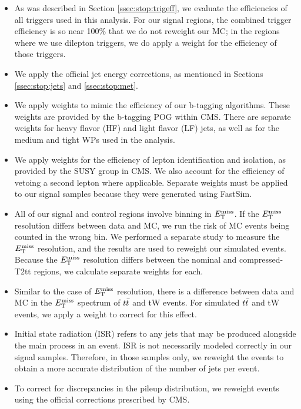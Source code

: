 \begin{itemize}
\item As was described in Section \ref{ssec:stop:trigeff}, we evaluate
  the efficiencies of all triggers used in this analysis. For our
  signal regions, the combined trigger efficiency is so near 100\% that we
  do not reweight our MC; in the regions where we use dilepton
  triggers, we do apply a weight for the efficiency of those triggers.
\item We apply the official jet energy corrections, as mentioned in
  Sections \ref{ssec:stop:jets} and \ref{ssec:stop:met}.
\item We apply weights to mimic the efficiency of our b-tagging
  algorithms. These weights are provided by the b-tagging POG within
  CMS. There are separate weights for heavy flavor (HF) and light
  flavor (LF) jets, as well as for the medium and tight WPs used in
  the analysis.
\item We apply weights for the efficiency of lepton identification and
  isolation, as provided by the SUSY group in CMS. We also account for
  the efficiency of vetoing a second lepton where applicable. Separate
  weights must be applied to our signal samples because they were
  generated using FastSim.
\item All of our signal and control regions involve binning in
  $E_\text{T}^\text{miss}$. If the $E_\text{T}^\text{miss}$ resolution differs between data and MC, we run
  the risk of MC events being counted in the wrong bin. We performed a
  separate study to measure the $E_\text{T}^\text{miss}$ resolution, %
  and the results are used to reweight our simulated events. Because
  the $E_\text{T}^\text{miss}$ resolution differs between the nominal and
  compressed-T2tt regions, we calculate separate weights for each. %
\item Similar to the case of $E_\text{T}^\text{miss}$ resolution, there is a difference
  between data and MC in the $E_\text{T}^\text{miss}$ spectrum of $t\bar{t}$ and tW events.
  For simulated $t\bar{t}$ and tW events, we apply a weight to correct
  for this effect.
\item Initial state radiation (ISR) refers to any jets that may be
  produced alongside the main process in an event. ISR is not
  necessarily modeled correctly in our signal samples. Therefore, in
  those samples only, we reweight the events to obtain a more accurate
  distribution of the number of jets per event.
\item To correct for discrepancies in the pileup distribution, we
  reweight events using the official corrections prescribed by CMS.
\end{itemize}

